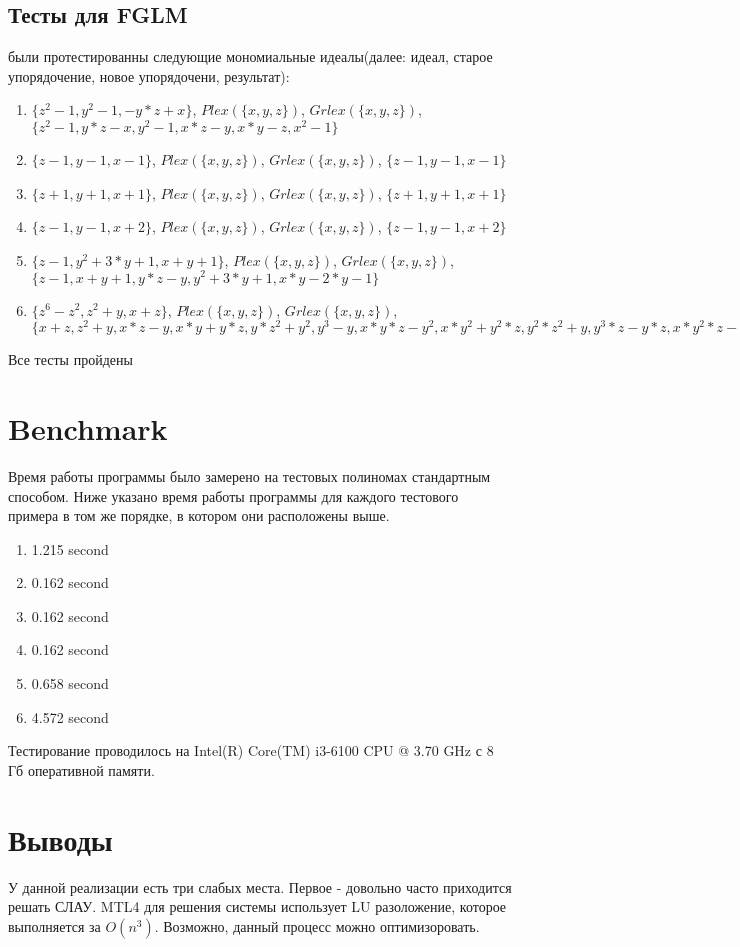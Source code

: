 \documentclass{article}
\begin{document}
 \subsection{Тесты для FGLM} 
 были протестированны следующие мономиальные идеалы(далее: идеал, старое упорядочение, новое упорядочени, результат):
 \begin{enumerate}
     \item $\{z^2-1, y^2-1, -y*z+x\}$, $Plex(\{x, y, z\})$, $Grlex(\{x, y, z\})$, $\{z^2 - 1, y * z - x, y^2 -1, x * z  -y, x * y  -z, x^2 - 1\}$
     \item $\{z-1, y-1, x-1\}$, $Plex(\{x, y, z\})$, $Grlex(\{x, y, z\})$, $\{z-1, y-1, x-1\}$
     \item $\{z+1, y+1, x+1\}$, $Plex(\{x, y, z\})$, $Grlex(\{x, y, z\})$, $\{z+1, y+1, x+1\}$
     \item $\{z-1, y-1, x+2\}$, $Plex(\{x, y, z\})$, $Grlex(\{x, y, z\})$, $\{z-1, y-1, x+2\}$
     \item $\{z-1, y^2+3*y+1, x+y+1\}$, $Plex(\{x, y, z\})$, $Grlex(\{x, y, z\})$, $\{z-1, x+y+1, y*z-y, y^2+3*y+1, x*y-2*y-1\}$
     \item $\{z^6-z^2, z^2+y, x+z\}$, $Plex(\{x, y, z\})$, $Grlex(\{x, y, z\})$, $\{x+z, z^2+y, x*z-y, x*y+y*z, y*z^2+y^2, y^3-y, x*y*z-y^2, x*y^2+y^2*z, y^2*z^2+y, y^3*z-y*z, x*y^2*z-y\}$
 \end{enumerate}
 Все тесты пройдены
 \section{Benchmark}
 Время работы программы было замерено на тестовых полиномах стандартным способом. Ниже указано время работы программы
 для каждого тестового примера в том же порядке, в котором они расположены выше.
 \begin{enumerate}
     \item 1.215 second
     \item 0.162 second
     \item 0.162 second
     \item 0.162 second
     \item 0.658 second
     \item 4.572 second
 \end{enumerate}

 Тестирование проводилось на Intel(R) Core(TM) i3-6100 CPU @ 3.70 GHz с 8 Гб оперативной памяти.
 \section{Выводы}
 У данной реализации есть три слабых места. Первое - довольно часто приходится решать СЛАУ. MTL4 для решения системы использует LU разоложение,
 которое выполняется за $O(n^3)$. Возможно, данный процесс можно оптимизоровать.
\end{document}
